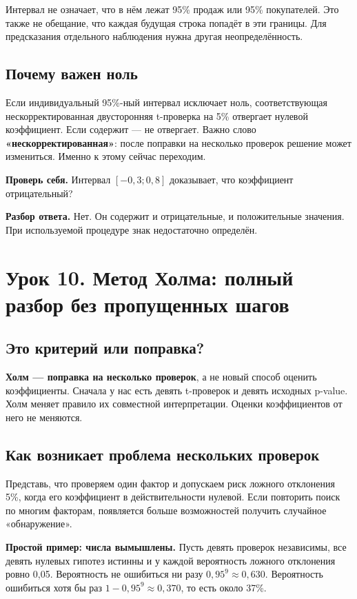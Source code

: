 \documentclass[12pt,a4paper]{article}
\newcommand{\toy}[1]{\par\textbf{Простой пример: числа вымышлены.} #1\par}
\newcommand{\check}[2]{\par\textbf{Проверь себя.} #1\par\textbf{Разбор ответа.} #2\par}
\begin{document}
Интервал не означает, что в нём лежат 95\% продаж или 95\% покупателей. Это также не обещание, что каждая будущая строка попадёт в эти границы. Для предсказания отдельного наблюдения нужна другая неопределённость.

\subsection{Почему важен ноль}

Если индивидуальный 95\%-ный интервал исключает ноль, соответствующая нескорректированная двусторонняя t-проверка на 5\% отвергает нулевой коэффициент. Если содержит --- не отвергает. Важно слово \textbf{«нескорректированная»}: после поправки на несколько проверок решение может измениться. Именно к этому сейчас переходим.

\check{Интервал $[-0{,}3;0{,}8]$ доказывает, что коэффициент отрицательный?}{Нет. Он содержит и отрицательные, и положительные значения. При используемой процедуре знак недостаточно определён.}

\section{Урок 10. Метод Холма: полный разбор без пропущенных шагов}
\label{lesson:holm}

\subsection{Это критерий или поправка?}

\textbf{Холм --- поправка на несколько проверок}, а не новый способ оценить коэффициенты. Сначала у нас есть девять t-проверок и девять исходных p-value. Холм меняет правило их совместной интерпретации. Оценки коэффициентов от него не меняются.

\subsection{Как возникает проблема нескольких проверок}

Представь, что проверяем один фактор и допускаем риск ложного отклонения 5\%, когда его коэффициент в действительности нулевой. Если повторить поиск по многим факторам, появляется больше возможностей получить случайное «обнаружение».

\toy{Пусть девять проверок независимы, все девять нулевых гипотез истинны и у каждой вероятность ложного отклонения ровно 0,05. Вероятность не ошибиться ни разу $0{,}95^9\approx0{,}630$. Вероятность ошибиться хотя бы раз $1-0{,}95^9\approx0{,}370$, то есть около 37\%.}
\end{document}
